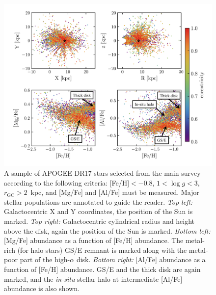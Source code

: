 \begin{figure}
    \centering
    \includegraphics[width=\textwidth]{figure/ch1/apogee_dr17_spatial_abundances.pdf}
    \caption{A sample of APOGEE DR17 stars selected from the main survey according to the following criteria: [Fe/H]$< -0.8$, $1 < \log g < 3$, $r_\mathrm{GC} > 2$~kpc, and [Mg/Fe] and [Al/Fe] must be measured. Major stellar populations are annotated to guide the reader. \textit{Top left:} Galactocentric X and Y coordinates, the position of the Sun is marked. \textit{Top right:} Galactocentric cylindrical radius and height above the disk, again the position of the Sun is marked. \textit{Bottom left:} [Mg/Fe] abundance as a function of [Fe/H] abundance. The metal-rich (for halo stars) GS/E remnant is marked along with the metal-poor part of the high-$\alpha$ disk. \textit{Bottom right:} [Al/Fe] abundance as a function of [Fe/H] abundance. GS/E and the thick disk are again marked, and the \textit{in-situ} stellar halo at intermediate [Al/Fe] abundance is also shown.}
    \label{ch1:fig:APOGEEDR17_spatial_abundances}
\end{figure}

